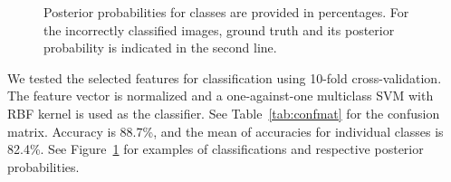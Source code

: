 \documentclass[hyperfootnotes=false]{article}
\begin{document}
\begin{figure}
	\captionsetup[subfigure]{labelformat=empty,justification=centering}
	\centering
	
	
	
	\vspace{-2mm}
	\caption{
		Posterior probabilities for classes are provided in percentages.
		For the incorrectly classified images, ground truth and its posterior probability is indicated in the second line.
	}
	\label{fig:qual}
\end{figure}

We tested the selected features for classification using 10-fold cross-validation.
The feature vector is  normalized and a one-against-one multiclass SVM with RBF kernel is used as the classifier.
See Table~\ref{tab:confmat} for the confusion matrix.
Accuracy is 88.7\%, and the mean of accuracies for individual classes is 82.4\%.
See Figure~\ref{fig:qual} for examples of classifications and respective posterior probabilities.
\end{document}
